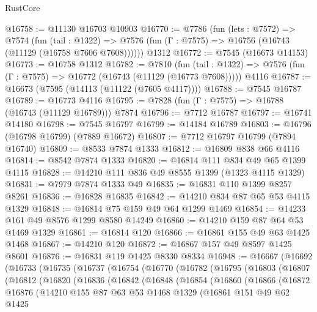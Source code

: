 \begin{lexlean}{RustCore}
\begin{coremodule}
@16758 := @11130 @16703 @10903
@16770 := @7786
    (fun (lets : @7572) =>
    @7574
      (fun (tail : @1322) =>
      @7576 (fun (Γ : @7575) => @16756 (@16743 (@11129 (@16758 @7606 @7608))))))
    @1312
@16772 := @7545 (@16673 @14153)
@16773 := @16758 @1312
@16782 := @7810
    (fun (tail : @1322) => @7576 (fun (Γ : @7575) => @16772 (@16743 (@11129 (@16773 @7608)))))
    @4116
@16787 := @16673 (@7595 (@14113 (@11122 (@7605 @4117))))
@16788 := @7545 @16787
@16789 := @16773 @4116
@16795 := @7828 (fun (Γ : @7575) => @16788 (@16743 (@11129 @16789))) @7874
@16796 := @7712 @16787
@16797 := @16741 @14180
@16798 := @7545 @16797
@16799 := @14184 @16789
@16803 := @16796 (@16798 @16799) (@7889 @16672)
@16807 := @7712 @16797 @16799 (@7894 @16740)
@16809 := @8533 @7874 @1333
@16812 := @16809 @838 @66 @4116
@16814 := @8542 @7874 @1333
@16820 := @16814 @111 @834 @49 @65 @1399 @4115
@16828 := @14210 @111 @836 @49 @8555 @1399 (@1323 @4115 @1329)
@16831 := @7979 @7874 @1333 @49
@16835 := @16831 @110 @1399 @8257 @8261
@16836 := @16828 @16835
@16842 := @14210 @834 @87 @65 @53 @4115 @1329
@16848 := @16814 @75 @159 @49 @64 @1299 @1469
@16854 := @14233 @161 @49 @8576 @1299 @8580 @14249
@16860 := @14210 @159 @87 @64 @53 @1469 @1329
@16861 := @16814 @120
@16866 := @16861 @155 @49 @63 @1425 @1468
@16867 := @14210 @120
@16872 := @16867 @157 @49 @8597 @1425 @8601
@16876 := @16831 @119 @1425 @8330 @8334
@16948 := @16667
    (@16692
      (@16733
        (@16735
          (@16737
            (@16754
              (@16770
                (@16782
                  (@16795
                    (@16803
                      (@16807
                        (@16812
                          (@16820
                            (@16836
                              (@16842
                                (@16848
                                  (@16854
                                    (@16860
                                      (@16866
                                        (@16872
                                          @16876
                                          (@14210
                                            @155
                                            @87
                                            @63
                                            @53
                                            @1468
                                            @1329
                                            (@16861
                                              @151
                                              @49
                                              @62
                                              @1425

\end{coremodule}
\end{lexlean}
